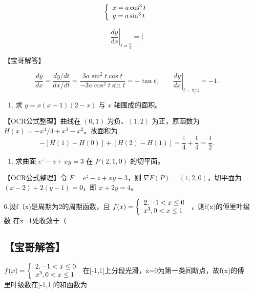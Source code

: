 \documentclass[11pt,fontset=fandol]{ctexart}
\providecommand{\tightlist}{\setlength{\itemsep}{0pt}\setlength{\parskip}{0pt}}
\begin{document}
\[
\scriptstyle { \left\{ \begin{array} { l l } { x = a \cos ^ { 3 } t } \\ { y = a \sin ^ { 3 } t } \end{array} \right. }
\]

\[
\left. { \frac { d y } { d x } } \right| _ { t = { \frac { \pi } { 4 } } } = (
\]

【宝哥解答】

\[
\frac{dy}{dx}=\frac{dy/dt}{dx/dt}
=\frac{3a\sin^2t\cos t}{-3a\cos^2t\sin t}=-\tan t,
\qquad \left.\frac{dy}{dx}\right|_{t=\pi/4}=-1.
\]

\begin{enumerate}
\def\labelenumi{\arabic{enumi}.}
\setcounter{enumi}{3}
\tightlist
\item
  求 \(y=x(x-1)(2-x)\) 与 \(x\) 轴围成的面积。
\end{enumerate}

【OCR公式整理】曲线在 \((0,1)\) 为负、\((1,2)\) 为正，原函数为
\(H(x)=-x^4/4+x^3-x^2\)。故面积为 \[
-[H(1)-H(0)]+[H(2)-H(1)]=\frac14+\frac14=\frac12.
\]

\begin{enumerate}
\def\labelenumi{\arabic{enumi}.}
\setcounter{enumi}{4}
\tightlist
\item
  求曲面 \(e^z-z+xy=3\) 在 \(P(2,1,0)\) 的切平面。
\end{enumerate}

【OCR公式整理】令 \(F=e^z-z+xy-3\)，则 \(\nabla F(P)=(1,2,0)\)，切平面为
\((x-2)+2(y-1)=0\)，即 \(x+2y=4\)。

6.设f（x)是周期为2的周期函数，且
\(f ( x ) = \left\{ { \begin{array} { l l } { 2 , - 1 < x \leq 0 } \\ { x ^ { 3 } , 0 < x \leq 1 } \end{array} } \right.\)
，则f(x)的傅里叶级数 在x=1处收敛于（

\subsection{【宝哥解答】}\label{ux5b9dux54e5ux89e3ux7b54}

\(f ( x ) = { \left\{ \begin{array} { l l } { 2 , - 1 < x \leq 0 } \\ { x ^ { 3 } , 0 < x \leq 1 } \end{array} \right. }\)
在{[}-1,1{]}上分段光滑，x=0为第一类间断点，故f(x)的傅里叶级数在{[}-1,1{]}的和函数为
\end{document}
